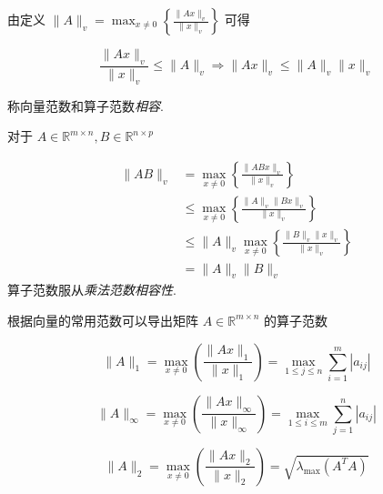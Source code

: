 由定义 $ \|A\|_{v}=\max _{x \neq 0}\left\{\frac{\|A x\|_{v}}{\|x\|_{v}}\right\} $ 可得

\begin{definition}[向量范数和算子范数相容]
    $$ \frac{\|A x\|_{v}}{\|x\|_{v}} \leq\|A\|_{v} \Rightarrow\|A x\|_{v} \leq\|A\|_{v}\|x\|_{v} $$

    称向量范数和算子范数\textit{相容}. 
\end{definition}

\begin{theorem}[算子范数服从乘法范数相容性]
   对于 $ A \in \mathbb{R}^{m \times n}, B \in \mathbb{R}^{n \times p} $

    $$\begin{aligned}
        \|A B\|_{v} &=\max _{x \neq 0}\left\{\frac{\|A B x\|_{v}}{\|x\|_{v}}\right\} \\
        & \leq \max _{x \neq 0}\left\{\frac{\|A\|_{v}\|B x\|_{v}}{\|x\|_{v}}\right\} \\
        & \leq\|A\|_{v} \max _{x \neq 0}\left\{\frac{\|B\|_{v}\|x\|_{v}}{\|x\|_{v}}\right\} \\
        & =\|A\|_{v}\|B\|_{v}
    \end{aligned}$$
    算子范数服从\textit{乘法范数相容性}.
\end{theorem}

根据向量的常用范数可以导出矩阵 $ A \in \mathbb{R}^{m \times n} $ 的算子范数

\begin{definition}[$A$的列范数]
    $$ \|A\|_{1}=\max _{x \neq 0}\left(\frac{\|A x\|_{1}}{\|x\|_{1}}\right)=\max _{1 \leq j \leq n} \sum_{i=1}^{m}\left|a_{i j}\right| $$
\end{definition}

\begin{definition}[$A$的行范数]
    $$ \|A\|_{\infty}=\max _{x \neq 0}\left( \frac{\|A x\|_{\infty}}{\|x\|_{\infty}}    \right)=\max _{1 \leq i \leq m} \sum_{j=1}^{n}\left|a_{i j}\right| $$
\end{definition}

\begin{definition}[$A$的2-范数]
    $$ \|A\|_{2}=\max _{x \neq 0}\left( \frac{\|A x\|_{2}}{\|x\|_{2}}  \right)=\sqrt{\lambda_{\max }\left(A^{T} A\right)} $$
\end{definition}

